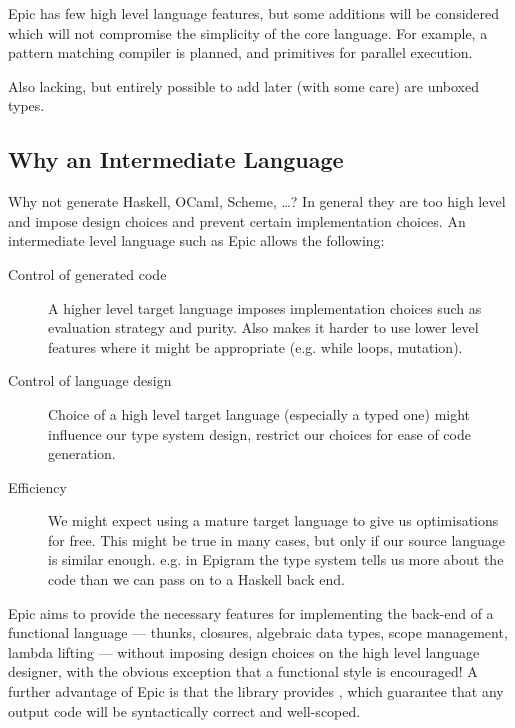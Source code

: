 Epic has few high level language features, but some additions will be
considered which will not compromise the simplicity of the core
language. For example, a pattern matching compiler is planned, and
primitives for parallel execution.

Also lacking, but entirely possible to add later (with some care) are
unboxed types.

\subsection{Why an Intermediate Language}

Why not generate Haskell, OCaml, Scheme, \ldots? In general they are
too high level and impose design choices and prevent certain
implementation choices. An intermediate level language such as Epic
allows the following:

\begin{description}
\item[Control of generated code]
A higher level target language imposes implementation choices such as
evaluation strategy and purity. Also makes it harder to use lower
level features where it might be appropriate (e.g. while loops, mutation).

\item[Control of language design]
Choice of a high level target language (especially a typed one) might
influence our type system design, restrict our choices for ease of
code generation. 

\item[Efficiency]
We might expect using a mature target language to give us
optimisations for free. This might be true in many cases, but only if
our source language is similar enough. e.g. in Epigram the type system
tells us more about the code than we can pass on to a Haskell back
end. 

\end{description}

Epic aims to provide the necessary features for implementing the
back-end of a functional language --- thunks, closures, algebraic data
types, scope management, lambda lifting --- without imposing
 design choices on the high level language designer, with
the obvious exception that a functional style is encouraged!
A further advantage of Epic is that the library provides
, which guarantee that any
output code will be syntactically correct and well-scoped.
